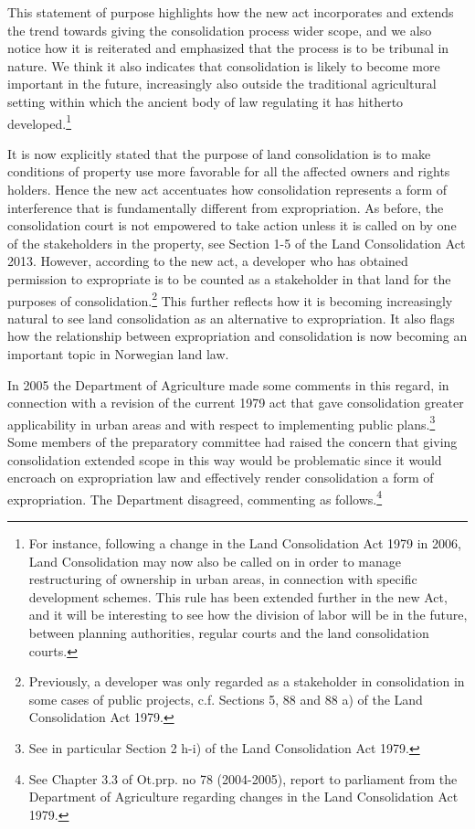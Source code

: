 This statement of purpose highlights how the new act incorporates and extends the trend towards giving the consolidation process wider scope, and we also notice how it is reiterated and emphasized that the process is to be tribunal in nature. We think it also indicates that consolidation is likely to become more important in the future, increasingly also outside the traditional agricultural setting within which the ancient body of law regulating it has hitherto developed.\footnote{For instance, following a change in the Land Consolidation Act 1979 in 2006, Land Consolidation may now also be called on in order to manage restructuring of ownership in urban areas, in connection with specific development schemes. This rule has been extended further in the new Act, and it will be interesting to see how the division of labor will be in the future, between planning authorities, regular courts and the land consolidation courts. }

It is now explicitly stated that the purpose of land consolidation is to make conditions of property use more favorable for all the affected owners and rights holders. Hence the new act accentuates how consolidation represents a form of interference that is fundamentally different from expropriation. As before, the consolidation court is not empowered to take action unless it is called on by one of the stakeholders in the property, see Section 1-5 of the Land Consolidation Act 2013. However, according to the new act, a developer who has obtained permission to expropriate is to be counted as a stakeholder in that land for the purposes of consolidation.\footnote{Previously, a developer was only regarded as a stakeholder in consolidation in some cases of public projects, c.f. Sections 5, 88 and 88 a) of the Land Consolidation Act 1979.} This further reflects how it is becoming increasingly natural to see land consolidation as an alternative to expropriation. It also flags how the relationship between expropriation and consolidation is now becoming an important topic in Norwegian land law.

In 2005 the Department of Agriculture made some comments in this regard, in connection with a revision of the current 1979 act that gave consolidation greater applicability in urban areas and with respect to implementing public plans.\footnote{See in particular Section 2 h-i) of the Land Consolidation Act 1979.} Some members of the preparatory committee had raised the concern that giving consolidation extended scope in this way would be problematic since it would encroach on expropriation law and effectively render consolidation a form of expropriation. The Department disagreed, commenting as follows.\footnote{See Chapter 3.3 of Ot.prp. no 78 (2004-2005), report to parliament from the Department of Agriculture regarding changes in the Land Consolidation Act 1979.}

